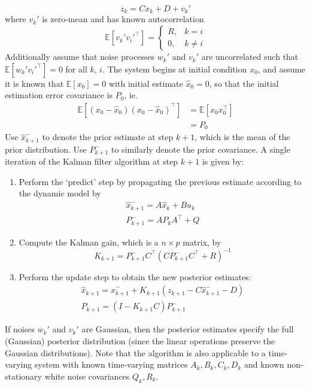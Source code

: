 \documentclass[11pt]{report} %
\begin{document}
\begin{equation}
z_{k} = Cx_{k} + D + v_{k}'
\end{equation}
where $v_{k}'$ is zero-mean and has known autocorrelation
\begin{equation}
\mathbb{E}\left[v_{k}'v_{i}'^{\top}\right] = \begin{cases} R, & k = i \\ 0, & k \neq i \end{cases}
\end{equation}
Additionally assume that noise processes $w_{k}'$ and $v_{k}'$ are uncorrelated such that $\mathbb{E}\left[w_{k}'v_{i}'^{\top}\right] = 0$ for all $k$, $i$. The system begins at initial condition $x_{0}$, and assume it is known that $\mathbb{E}\left[x_{0}\right] = 0$ with initial estimate $\hat{x}_{0} = 0$, so that the initial estimation error covariance is $P_{0}$, ie.
\begin{align}
\mathbb{E}\left[\left(x_{0} - \hat{x}_{0}\right)\left(x_{0} - \hat{x}_{0}\right)^{\top}\right] &= \mathbb{E}\left[x_{0}x_{0}^{\top}\right] \\
&= P_{0}
\end{align}
Use $\hat{x}_{k + 1}^{-}$ to denote the prior estimate at step $k + 1$, which is the mean of the prior distribution. Use $P_{k + 1}^{-}$ to similarly denote the prior covariance. A single iteration of the Kalman filter algorithm at step $k + 1$ is given by:
\begin{enumerate}
\item Perform the `predict' step by propagating the previous estimate according to the dynamic model by
\begin{gather}
\hat{x}_{k + 1}^{-} = A\hat{x}_{k} + Bu_{k} \\
P_{k + 1}^{-} = AP_{k}A^{\top} + Q
\end{gather}
\item Compute the Kalman gain, which is a $n\times p$ matrix, by
\begin{equation}
K_{k + 1} = P_{k + 1}^{-}C^{\top}\left(CP_{k + 1}^{-}C^{\top} + R\right)^{-1}
\end{equation}
\item Perform the update step to obtain the new posterior estimates:
\begin{gather}
\hat{x}_{k + 1} = \hat{x}_{k + 1}^{-} + K_{k + 1}\left(z_{k + 1} - C\hat{x}_{k + 1}^{-} - D\right) \\
P_{k + 1} = \left(I - K_{k + 1}C\right)P_{k + 1}^{-}
\end{gather}
\end{enumerate}
If noises $w_{k}'$ and $v_{k}'$ are Gaussian, then the posterior estimates specify the full (Gaussian) posterior distribution (since the linear operations preserve the Gaussian distributions). Note that the algorithm is also applicable to a time-varying system with known time-varying matrices $A_{k}, B_{k}, C_{k}, D_{k}$ and known non-stationary white noise covariances $Q_{k}, R_{k}$.
\end{document}
